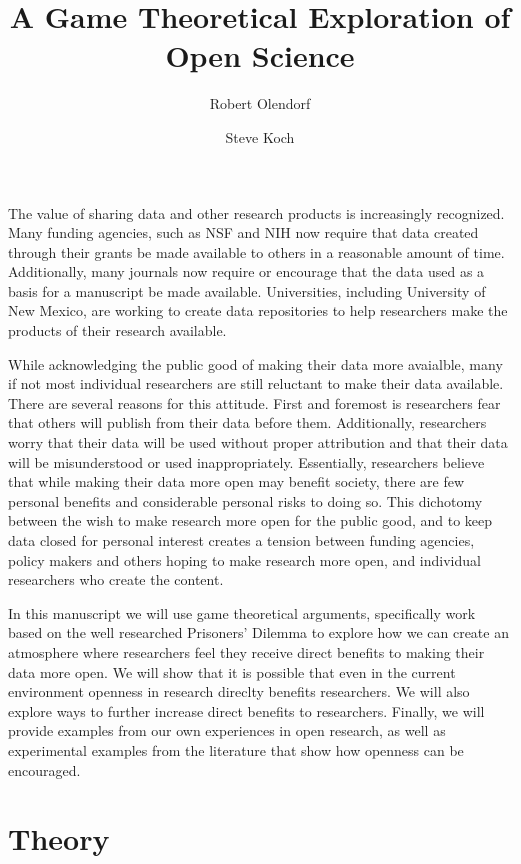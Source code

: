 \documentclass[11pt]{article} %
\title{A Game Theoretical Exploration of Open Science}
\author[1]{Robert Olendorf}
\author[2]{Steve Koch}
\affil[1]{University Libraries, University of New Mexico}
\affil[2]{Department of Physics and Astronomy, University of New Mexico}
\begin{document}
\maketitle


The value of sharing data and other research products is increasingly recognized. Many funding agencies, such as NSF and NIH now require that data created through their grants be made available to others in a reasonable amount of time. Additionally, many journals now require or encourage that the data used as a basis for a manuscript be made available. Universities, including University of New Mexico, are working to create data repositories to help researchers make the products of their research available. 

While acknowledging the public good of making their data more avaialble, many if not most individual researchers are still reluctant to make their data available. There are several reasons for this attitude. First and foremost is researchers fear that others will publish from their data before them. Additionally, researchers worry that their data will be used without proper attribution and that their data will be misunderstood or used inappropriately. Essentially, researchers believe that while making their data more open may benefit society, there are few personal benefits and considerable personal risks to doing so. This dichotomy between the wish to make research more open for the public good, and to keep data closed for personal interest creates a tension between funding agencies, policy makers and others hoping to make research more open, and individual researchers who create the content.

In this manuscript we will use game theoretical arguments, specifically work based on the well researched Prisoners' Dilemma to explore how we can create an atmosphere where researchers feel they receive direct benefits to making their data more open. We will show that it is possible that even in the current environment openness in research direclty benefits researchers. We will also explore ways to further increase direct benefits to researchers. Finally, we will provide examples from our own experiences in open research, as well as experimental examples from the literature that show how openness can be encouraged.
\section{Theory}
\end{document}
